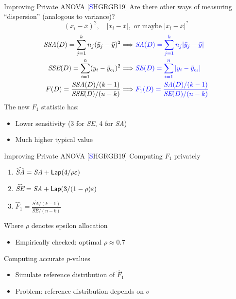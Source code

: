 \documentclass{beamer}
\newcommand{\sse}{\textit{SSE}\xspace}
\newcommand{\ssa}{\textit{SSA}\xspace}
\newcommand{\se}{\textit{SE}\xspace}
\newcommand{\sa}{\textit{SA}\xspace}
\newcommand{\lap}{\ensuremath{{\sf Lap}}\xspace}
\begin{document}
\begin{frame}{Improving Private ANOVA [\textcolor{blue}{S}HGRGB19]}
\pause
Are there other ways of measuring ``dispersion'' (analogous to variance)? \pause
$$(x_i - \bar{x})^2, \quad \lvert x_i - \bar{x} \rvert, \text{ or maybe }\lvert x_i - \bar{x} \rvert^?$$  \pause
\begin{align*}
\ssa(D) = \sum_{j=1}^{k} n_j (\bar{y}_j - \bar{y})^2  &\Longrightarrow \textcolor{blue}{ \sa(D) = \sum_{j=1}^{k} n_j |\bar{y}_j - \bar{y}| }\\  
\sse(D) = \sum_{i=1}^{n}  (y_{i}-\bar{y}_{c_i})^2  &\Longrightarrow \textcolor{blue}{\se(D) = \sum_{i=1}^{n}  |y_{i}-\bar{y}_{c_i}| } \\  
F(D) = \frac{\ssa(D)/(k-1)}{\sse(D)/(n-k)} &\Longrightarrow  \textcolor{blue} {F_1(D) = \frac{\sa(D)/(k-1)}{\se(D)/(n-k)}}
\end{align*}
 \pause
The new $F_1$ statistic has: \pause
\begin{itemize}
\item Lower sensitivity (3 for \se, 4 for \sa) \pause
\item Much higher typical value 
\end{itemize}
\end{frame}



\begin{frame}{Improving Private ANOVA [\textcolor{blue}{S}HGRGB19]}
Computing $F_1$ privately \pause
\begin{enumerate}
	\item $\widehat{\sa}  = \sa + \lap(4/\rho\varepsilon)$
    \item $\widehat{\se} = \sa + \lap(3/(1-\rho)\varepsilon)$ \pause
    \item $\widehat{F}_1 = \frac{\widehat{\sa}/(k-1)}{\widehat{\se}/(n-k)}$ \pause
\end{enumerate}
Where $\rho$ denotes epsilon allocation
\begin{itemize}
	\item Empirically checked: optimal $\rho \approx 0.7$ \pause
\end{itemize}
Computing accurate $p$-values \pause
\begin{itemize}
	\item Simulate reference distribution of $\widehat{F}_1$ \pause
	\item Problem: reference distribution depends on $\sigma$
\end{itemize}
\end{frame}
\end{document}
